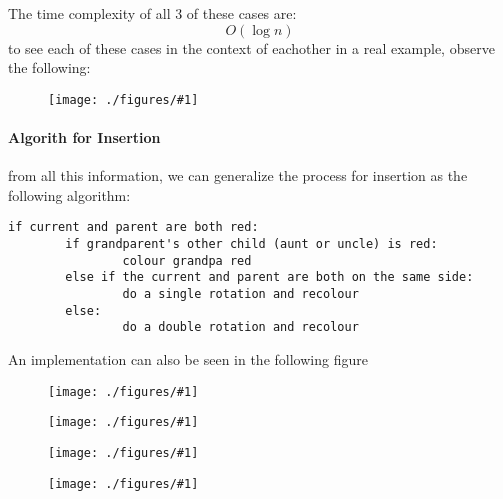 \documentclass[12pt]{book}
\newcommand{\incimg}[2]{%
       \begin{figure}[h]
               \centering
               \texttt{[image: ./figures/\#1]}
       \end{figure}
}
\begin{document}
The time complexity of all 3 of these cases are:
        \[O(\log n)\]
to see each of these cases in the context of eachother in a real example, observe the following:
\incimg{bigEx}{0.5}

\paragraph{Algorith for Insertion}
from all this information, we can generalize the process for insertion as the following algorithm:
\begin{verbatim}
if current and parent are both red:
        if grandparent's other child (aunt or uncle) is red:
                colour grandpa red
        else if the current and parent are both on the same side:
                do a single rotation and recolour
        else:
                do a double rotation and recolour
\end{verbatim}

An implementation can also be seen in the following figure
\incimg{insEx}{0.5}
\incimg{LLfix}{0.3}
\incimg{LRfix}{0.3}
\incimg{AllCases}{0.6}
\end{document}

